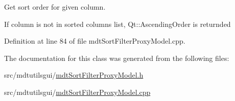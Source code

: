 Get sort order for given column. 

If column is not in sorted columns list, Qt\-::\-Ascending\-Order is returnded 

Definition at line 84 of file mdt\-Sort\-Filter\-Proxy\-Model.\-cpp.



The documentation for this class was generated from the following files\-:\begin{DoxyCompactItemize}
\item 
src/mdtutilsgui/\hyperlink{mdt_sort_filter_proxy_model_8h}{mdt\-Sort\-Filter\-Proxy\-Model.\-h}\item 
src/mdtutilsgui/\hyperlink{mdt_sort_filter_proxy_model_8cpp}{mdt\-Sort\-Filter\-Proxy\-Model.\-cpp}\end{DoxyCompactItemize}
